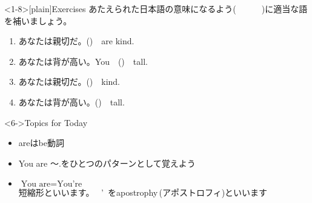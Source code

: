 \documentclass[aspectratio=169,xcolor={dvipsnames,table}]{beamer}
\newcommand{\myaudio}[1]{\href{#1}{\faVolumeUp}}
\begin{document}
\begin{frame}<1-8>[plain]{Exercises}
あたえられた日本語の意味になるよう(~~~~~~)に適当な語を補いましょう。

\begin{enumerate}
 \item あなたは親切だ。()~~are kind.
 \item あなたは背が高い。You~~()~~tall.
 \item あなたは親切だ。()~~kind.
 \item あなたは背が高い。()~~tall.
\end{enumerate}

 \begin{exampleblock}<6->{Topics for Today}
\begin{itemize}
 \item<6> areはbe動詞
 \item<7> You are 〜.をひとつのパターンとして覚えよう
 \item<8-> $\text{You are}=\text{You're}$\\
\mbox{}\hfill{}短縮形といいます。 \colorbox[gray]{0.9}{~'~}をapostrophy\,(アポストロフィ)といいます\phantom{あ}
\end{itemize}
     \end{exampleblock}

\myaudio{audio/002_be_031.mp3}
\end{frame}

\end{document}

